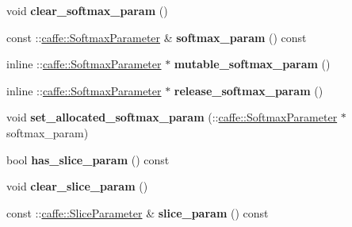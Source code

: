 \begin{DoxyCompactItemize}
\item 
\mbox{\label{classcaffe_1_1_v1_layer_parameter_a5d67ba7462f227738aa50283b9a93ed2}} 
void {\bfseries clear\+\_\+softmax\+\_\+param} ()
\item 
\mbox{\label{classcaffe_1_1_v1_layer_parameter_a08544390607dfff069aec897b2beb905}} 
const \+::\mbox{\hyperlink{classcaffe_1_1_softmax_parameter}{caffe\+::\+Softmax\+Parameter}} \& {\bfseries softmax\+\_\+param} () const
\item 
\mbox{\label{classcaffe_1_1_v1_layer_parameter_a9d401083dea38dba74ccddb855da8af4}} 
inline \+::\mbox{\hyperlink{classcaffe_1_1_softmax_parameter}{caffe\+::\+Softmax\+Parameter}} $\ast$ {\bfseries mutable\+\_\+softmax\+\_\+param} ()
\item 
\mbox{\label{classcaffe_1_1_v1_layer_parameter_ae16f50e8593c22b175ce55f0ba6987ba}} 
inline \+::\mbox{\hyperlink{classcaffe_1_1_softmax_parameter}{caffe\+::\+Softmax\+Parameter}} $\ast$ {\bfseries release\+\_\+softmax\+\_\+param} ()
\item 
\mbox{\label{classcaffe_1_1_v1_layer_parameter_a9438215a625a5d4e40188120590ecc03}} 
void {\bfseries set\+\_\+allocated\+\_\+softmax\+\_\+param} (\+::\mbox{\hyperlink{classcaffe_1_1_softmax_parameter}{caffe\+::\+Softmax\+Parameter}} $\ast$softmax\+\_\+param)
\item 
\mbox{\label{classcaffe_1_1_v1_layer_parameter_a5ac41ea6cd67ce18704befc422f4ad63}} 
bool {\bfseries has\+\_\+slice\+\_\+param} () const
\item 
\mbox{\label{classcaffe_1_1_v1_layer_parameter_ae7d6109f3daff6dddd34abc3986225f2}} 
void {\bfseries clear\+\_\+slice\+\_\+param} ()
\item 
\mbox{\label{classcaffe_1_1_v1_layer_parameter_aaa8cd1475859162434904582676dde69}} 
const \+::\mbox{\hyperlink{classcaffe_1_1_slice_parameter}{caffe\+::\+Slice\+Parameter}} \& {\bfseries slice\+\_\+param} () const
\item 

\end{DoxyCompactItemize}
